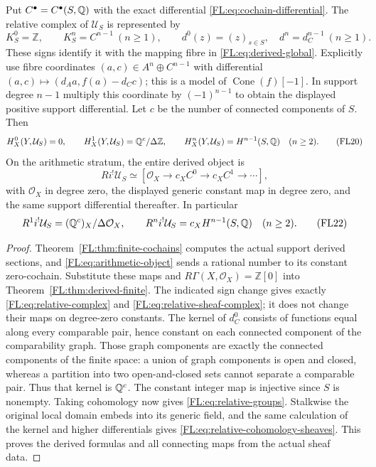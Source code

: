 \begin{theorem}
\label{FL:thm:whole-relative-complex}
Put $C^\bullet=C^\bullet(S,\mathbb Q)$ with the exact differential
\eqref{FL:eq:cochain-differential}. The relative complex of
$\mathcal U_S$ is represented by
\[
 K_S^0=\mathbb Z,\qquad K_S^n=C^{n-1}\ (n\ge1),\qquad
 d^0(z)=(z)_{s\in S},\quad d^n=d_C^{n-1}\ (n\ge1).
 \tag{FL19}\label{FL:eq:relative-complex}
\]
These signs identify it with the mapping fibre in
\eqref{FL:eq:derived-global}. Explicitly use fibre coordinates
$(a,c)\in A^n\oplus C^{n-1}$ with differential
$(a,c)\mapsto(d_Aa,f(a)-d_Cc)$; this is a model of
$\operatorname{Cone}(f)[-1]$. In support degree $n-1$ multiply this
coordinate by $(-1)^{n-1}$ to obtain the displayed positive
support differential. Let $c$ be the number
of connected components of $S$. Then
\[
 H_X^0(Y,\mathcal U_S)=0,\qquad
 H_X^1(Y,\mathcal U_S)=\mathbb Q^c/\Delta\mathbb Z,
 \qquad
 H_X^n(Y,\mathcal U_S)=H^{n-1}(S,\mathbb Q)\quad(n\ge2).
 \tag{FL20}\label{FL:eq:relative-groups}
\]
On the arithmetic stratum, the entire derived object is
\[
 Ri^!\mathcal U_S\simeq
 [\mathcal O_X\longrightarrow c_XC^0\longrightarrow
 c_XC^1\longrightarrow\cdots],
 \tag{FL21}\label{FL:eq:relative-sheaf-complex}
\]
with $\mathcal O_X$ in degree zero, the displayed generic constant
map in degree zero, and the same support differential thereafter.
In particular
\[
 R^1i^!\mathcal U_S=(\mathbb Q^c)_X/\Delta\mathcal O_X,
 \qquad R^ni^!\mathcal U_S=c_XH^{n-1}(S,\mathbb Q)\quad(n\ge2).
 \tag{FL22}\label{FL:eq:relative-cohomology-sheaves}
\]
\end{theorem}
\begin{proof}
Theorem~\ref{FL:thm:finite-cochains} computes the actual support derived
sections, and \eqref{FL:eq:arithmetic-object} sends a rational number
to its constant zero-cochain. Substitute these maps and
$R\Gamma(X,\mathcal O_X)=\mathbb Z[0]$ into
Theorem~\ref{FL:thm:derived-finite}. The indicated sign change gives
exactly \eqref{FL:eq:relative-complex} and
\eqref{FL:eq:relative-sheaf-complex}; it does not change their maps on
degree-zero constants.
The kernel of $d_C^0$ consists of functions equal along every
comparable pair, hence constant on each connected component of the
comparability graph. Those graph components are exactly the connected
components of the finite space: a union of graph components is open
and closed, whereas a partition into two open-and-closed sets cannot
separate a comparable pair. Thus that kernel is $\mathbb Q^c$.
The constant integer map is injective since $S$ is nonempty. Taking
cohomology now gives \eqref{FL:eq:relative-groups}. Stalkwise the original
local domain embeds into its generic field, and the same calculation
of the kernel and higher differentials gives
\eqref{FL:eq:relative-cohomology-sheaves}. This proves the derived
formulas and all connecting maps from the actual sheaf data.
\end{proof}

